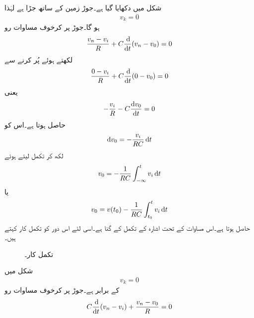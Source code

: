 شکل  میں  دکھایا گیا ہے۔جوڑ  زمین کے ساتھ جڑا ہے لہٰذا
\begin{align*}
v_k=0
\end{align*}
ہو گا۔جوڑ  پر کرخوف مساوات رو
\begin{align*}
\frac{v_n-v_i}{R}+C \frac{\dif }{\dif t}(v_n-v_0)=0
\end{align*}
لکھتے ہوئے  پُر کرنے سے
\begin{align*}
\frac{0-v_i}{R}+C \frac{\dif }{\dif t}(0-v_0)=0
\end{align*}
یعنی
\begin{align*}
-\frac{v_i}{R}-C \frac{\dif v_0}{\dif t}=0
\end{align*}
حاصل ہوتا  ہے۔اس کو
\begin{align*}
\dif v_0=-\frac{v_i}{RC} \dif t
\end{align*}
لکھ کر تکمل لیتے ہوئے
\begin{align}
v_0=-\frac{1}{RC} \int_{-\infty}^{t} v_i \dif t
\end{align}
یا
\begin{align}\label{مساوات_امالہ_تکمل_کار_الف}
v_0=v(t_0)-\frac{1}{RC} \int_{t_0}^{t} v_i \dif t
\end{align}
حاصل ہوتا ہے۔اس مساوات کے تحت  اشارہ   کے تکمل کے  گنا ہے۔اسی لئے اس دور کو تکمل کار کہتے ہیں۔
\begin{figure}
\centering
{}
\caption{تکمل کار۔}
\label{شکل_امالہ_تکمل_کار}
\end{figure}
شکل  میں
\begin{align*}
v_k=0
\end{align*}
کے برابر ہے۔جوڑ  پر کرخوف مساوات رو
\begin{align*}
C\frac{\dif }{\dif t}(v_n-v_i)+\frac{v_n-v_0}{R}=0
\end{align*}
